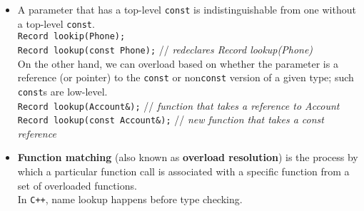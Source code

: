 \begin{itemize}
\item
A parameter that has a top-level \texttt{const} is indistinguishable from one without a top-level \texttt{const}.\\
\hspace*{1em}\texttt{Record lookip(Phone);}\\
\hspace*{1em}\texttt{Record lookup(const Phone);} // \textit{redeclares Record lookup(Phone)}\\
On the other hand, we can overload based on whether the parameter is a reference (or pointer) to the \texttt{const} or non\texttt{const} version of a given type; such \texttt{const}s are low-level.\\
\hspace*{1em}\texttt{Record lookup(Account\&);} // \textit{function that takes a reference to Account}\\
\hspace*{1em}\texttt{Record lookup(const Account\&);} // \textit{new function that takes a const reference}

\item
\textbf{Function matching} (also known as \textbf{overload resolution}) is the process by which a particular function call is associated with a specific function from a set of overloaded functions.\\
In \texttt{C++}, name lookup happens before type checking.


\end{itemize}
